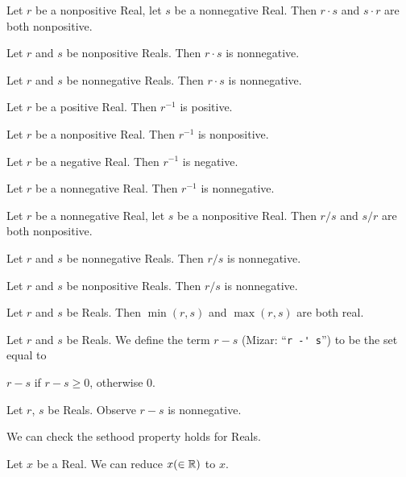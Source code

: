 \documentclass{article}
\begin{document}
Let $r$ be a nonpositive Real, let $s$ be a nonnegative Real.
Then $r\cdot s$ and $s\cdot r$ are both nonpositive.

Let $r$ and $s$ be nonpositive Reals. Then $r\cdot s$ is nonnegative.

Let $r$ and $s$ be nonnegative Reals. Then $r\cdot s$ is nonnegative.

Let $r$ be a positive Real. Then $r^{-1}$ is positive.

Let $r$ be a nonpositive Real. Then $r^{-1}$ is nonpositive.

Let $r$ be a negative Real. Then $r^{-1}$ is negative.

Let $r$ be a nonnegative Real. Then $r^{-1}$ is nonnegative.

Let $r$ be a nonnegative Real, let $s$ be a nonpositive Real.
Then $r/s$ and $s/r$ are both nonpositive.

Let $r$ and $s$ be nonnegative Reals.
Then $r/s$ is nonnegative.

Let $r$ and $s$ be nonpositive Reals.
Then $r/s$ is nonnegative.

Let $r$ and $s$ be Reals.
Then $\min(r,s)$ and $\max(r,s)$ are both real.

\begin{definition}
Let $r$ and $s$ be Reals.
We define the term $r-s$ (Mizar: ``\verb#r -' s#'') to be the set equal
to
\begin{defn}
\item $r-s$ if $r-s\geq0$, otherwise $0$.
\end{defn}
\end{definition}

Let $r$, $s$ be Reals.
Observe $r-s$ is nonnegative.

We can check the sethood property holds for Reals.

Let $x$ be a Real.
We can reduce $x(\in \mathbb{R})$ to $x$.
\end{document}
